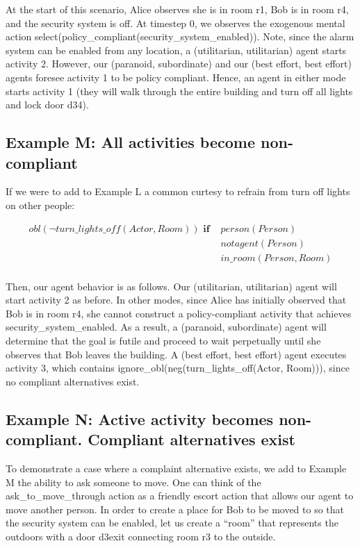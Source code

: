 At the start of this scenario, Alice observes she is in room r1, Bob is in room r4, and the security system is off.
At timestep 0, we observes the exogenous mental action select(policy\_compliant(security\_system\_enabled)).
Note, since the alarm system can be enabled from any location, a (utilitarian, utilitarian) agent starts activity 2.
However, our (paranoid, subordinate) and our (best effort, best effort) agents foresee activity 1 to be policy compliant.
Hence, an agent in either mode starts activity 1 (they will walk through the entire building and turn off all lights and lock door d34).

\subsection{Example M: All activities become non-compliant}

If we were to add to Example L a common curtesy to refrain from turn off lights on other people:

\begin{equation}
\begin{split}
\label{apia:example_m_obl_neg_turn_lights_off}
obl(\neg turn\_lights\_off(Actor, Room)) \textbf{ if }
    & person(Person) \\
    & not agent(Person) \\
    & in\_room(Person, Room) \\
\end{split}
\end{equation}

Then, our agent behavior is as follows.
Our (utilitarian, utilitarian) agent will start activity 2 as before.
In other modes, since Alice has initially observed that Bob is in room r4, she cannot construct a policy-compliant activity that achieves security\_system\_enabled.
As a result, a (paranoid, subordinate) agent will determine that the goal is futile and proceed to wait perpetually until she observes that Bob leaves the building.
A (best effort, best effort) agent executes activity 3, which contains ignore\_obl(neg(turn\_lights\_off(Actor, Room))), since no compliant alternatives exist.

\subsection{Example N: Active activity becomes non-compliant. Compliant alternatives exist}

To demonstrate a case where a complaint alternative exists, we add to Example M the ability to ask someone to move.
One can think of the ask\_to\_move\_through action as a friendly escort action that allows our agent to move another person.
In order to create a place for Bob to be moved to so that the security system can be enabled, let us create a “room” that represents the outdoors with a door d3exit connecting room r3 to the outside.


